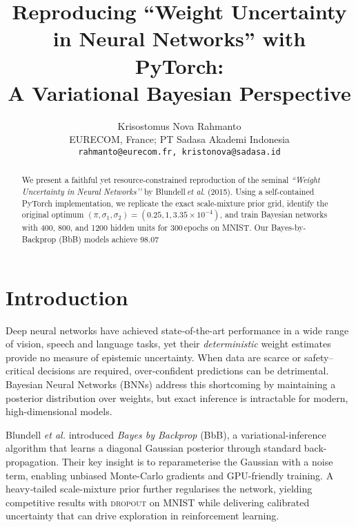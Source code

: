 \documentclass{article}
\title{Reproducing ``Weight Uncertainty in Neural Networks'' with PyTorch: \\ A Variational Bayesian Perspective}
\author{
  Krisostomus Nova Rahmanto \\
  EURECOM, France; PT Sadasa Akademi Indonesia \\
  \texttt{rahmanto@eurecom.fr, kristonova@sadasa.id} \\
}
\begin{document}
\maketitle

\begin{abstract}
We present a faithful yet resource-constrained reproduction of the seminal \emph{“Weight Uncertainty in Neural Networks’’} by Blundell\,\textit{et al}. (2015).  Using a self-contained PyTorch implementation, we replicate the exact scale-mixture prior grid, identify the original optimum $(\pi, \sigma_{1}, \sigma_{2})=(0.25,1,3.35\times10^{-4})$, and train Bayesian networks with 400, 800, and 1200 hidden units for 300\,epochs on MNIST.  Our Bayes-by-Backprop (BbB) models achieve 98.07 %
\end{abstract}

\section{Introduction}
Deep neural networks have achieved state‐of-the-art performance in a wide range of vision, speech and language tasks, yet their \emph{deterministic} weight estimates provide no measure of epistemic uncertainty.  When data are scarce or safety–critical decisions are required, over-confident predictions can be detrimental.  Bayesian Neural Networks (BNNs) address this shortcoming by maintaining a posterior distribution over weights, but exact inference is intractable for modern, high-dimensional models.

Blundell \textit{et al.} \cite{blundell2015weight} introduced \emph{Bayes by Backprop} (BbB), a variational-inference algorithm that learns a diagonal Gaussian posterior through standard back-propagation.  Their key insight is to reparameterise the Gaussian with a noise term, enabling unbiased Monte-Carlo gradients and GPU-friendly training.  A heavy‐tailed scale-mixture prior further regularises the network, yielding competitive results with \textsc{dropout} on MNIST while delivering calibrated uncertainty that can drive exploration in reinforcement learning.
\end{document}
